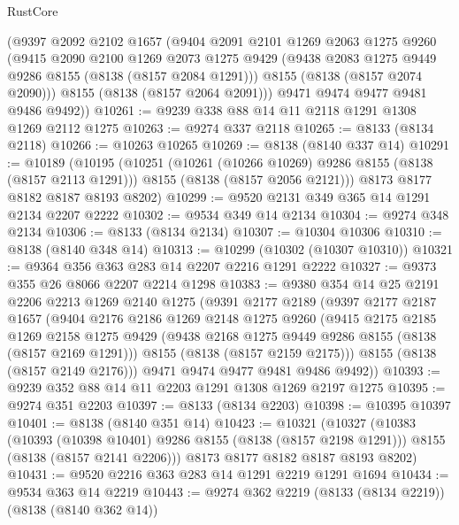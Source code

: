\begin{lexlean}{RustCore}
\begin{coremodule}
      (@9397
        @2092
        @2102
        @1657
        (@9404
          @2091
          @2101
          @1269
          @2063
          @1275
          @9260
          (@9415
            @2090
            @2100
            @1269
            @2073
            @1275
            @9429
            (@9438 @2083 @1275 @9449 @9286 @8155 (@8138 (@8157 @2084 @1291)))
            @8155
            (@8138 (@8157 @2074 @2090)))
          @8155
          (@8138 (@8157 @2064 @2091)))
        @9471
        @9474
        @9477
        @9481
        @9486
        @9492))
@10261 := @9239 @338 @88 @14 @11 @2118 @1291 @1308 @1269 @2112 @1275
@10263 := @9274 @337 @2118
@10265 := @8133 (@8134 @2118)
@10266 := @10263 @10265
@10269 := @8138 (@8140 @337 @14)
@10291 := @10189
    (@10195
      (@10251
        (@10261 (@10266 @10269) @9286 @8155 (@8138 (@8157 @2113 @1291)))
        @8155
        (@8138 (@8157 @2056 @2121)))
      @8173
      @8177
      @8182
      @8187
      @8193
      @8202)
@10299 := @9520 @2131 @349 @365 @14 @1291 @2134 @2207 @2222
@10302 := @9534 @349 @14 @2134
@10304 := @9274 @348 @2134
@10306 := @8133 (@8134 @2134)
@10307 := @10304 @10306
@10310 := @8138 (@8140 @348 @14)
@10313 := @10299 (@10302 (@10307 @10310))
@10321 := @9364 @356 @363 @283 @14 @2207 @2216 @1291 @2222
@10327 := @9373 @355 @26 @8066 @2207 @2214 @1298
@10383 := @9380
    @354
    @14
    @25
    @2191
    @2206
    @2213
    @1269
    @2140
    @1275
    (@9391
      @2177
      @2189
      (@9397
        @2177
        @2187
        @1657
        (@9404
          @2176
          @2186
          @1269
          @2148
          @1275
          @9260
          (@9415
            @2175
            @2185
            @1269
            @2158
            @1275
            @9429
            (@9438 @2168 @1275 @9449 @9286 @8155 (@8138 (@8157 @2169 @1291)))
            @8155
            (@8138 (@8157 @2159 @2175)))
          @8155
          (@8138 (@8157 @2149 @2176)))
        @9471
        @9474
        @9477
        @9481
        @9486
        @9492))
@10393 := @9239 @352 @88 @14 @11 @2203 @1291 @1308 @1269 @2197 @1275
@10395 := @9274 @351 @2203
@10397 := @8133 (@8134 @2203)
@10398 := @10395 @10397
@10401 := @8138 (@8140 @351 @14)
@10423 := @10321
    (@10327
      (@10383
        (@10393 (@10398 @10401) @9286 @8155 (@8138 (@8157 @2198 @1291)))
        @8155
        (@8138 (@8157 @2141 @2206)))
      @8173
      @8177
      @8182
      @8187
      @8193
      @8202)
@10431 := @9520 @2216 @363 @283 @14 @1291 @2219 @1291 @1694
@10434 := @9534 @363 @14 @2219
@10443 := @9274 @362 @2219 (@8133 (@8134 @2219)) (@8138 (@8140 @362 @14))

\end{coremodule}
\end{lexlean}
